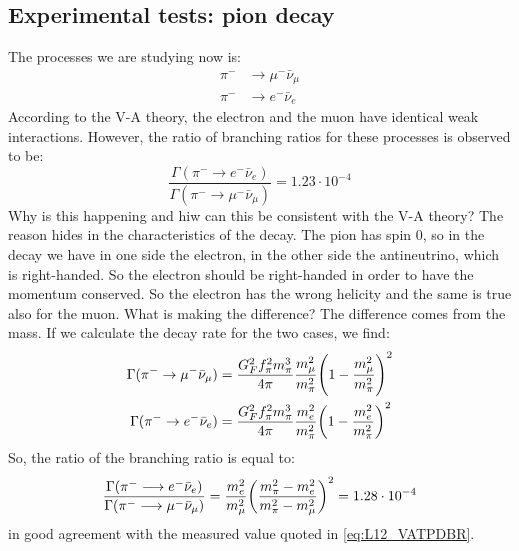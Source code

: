 \documentclass[../../main/main.tex]{subfiles}
\begin{document}
\subsection{Experimental tests: pion decay}
The processes we are studying now is:
\begin{align}
	\pi^- &\longrightarrow \mu^-\bar{\nu}_{\mu}	\\
	\pi^- &\longrightarrow e^-\bar{\nu}_{e}
\end{align}
According to the V-A theory, the electron and the muon have identical weak interactions. However, the ratio of branching ratios for these processes is observed to be:
\begin{equation}
	\frac{\Gamma(\pi^- \longrightarrow e^-\bar{\nu}_{e})}{\Gamma(\pi^- \longrightarrow \mu^-\bar{\nu}_{\mu})}
	=
	1.23 \cdot 10^{-4}
	\label{eq:L12_VATPDBR}
\end{equation}
Why is this happening and hiw can this be consistent with the V-A theory? The reason hides in the characteristics of the decay. The pion has spin 0, so in the decay we have in one side the electron, in the other side the antineutrino, which is right-handed. So the electron should be right-handed in order to have the momentum conserved. So the electron has the wrong helicity and the same is true also for the muon. What is making the difference? The difference comes from the mass. If we calculate the decay rate for the two cases, we find:
\begin{align}
	\Gamma(\pi^- \rightarrow \mu^-\bar{\nu}_{\mu})
	&=
	\frac{G^2_F f^2_{\pi} m^3_{\pi}}{4\pi} \frac{m^2_{\mu}}{m^2_{\pi}} \qty(1 - \frac{m^2_{\mu}}{m^2_{\pi}})^2
	\\
	\Gamma(\pi^- \rightarrow e^-\bar{\nu}_{e})
	&=
	\frac{G^2_F f^2_{\pi} m^3_{\pi}}{4\pi} \frac{m^2_{e}}{m^2_{\pi}} \qty(1 - \frac{m^2_{e}}{m^2_{\pi}})^2
\end{align}
So, the ratio of the branching ratio is equal to:
\begin{equation}
	\frac{\Gamma(\pi^- \longrightarrow e^-\bar{\nu}_{e})}{\Gamma(\pi^- \longrightarrow \mu^-\bar{\nu}_{\mu})}
	=
	\frac{m^2_e}{m^2_{\mu}} \qty(\frac{m^2_{\pi} - m^2_{e}}{m^2_{\pi} - m^2_{\mu}})^2
	=
	1.28 \cdot 10^{-4}
	\label{eq:L12_VATPDBR_2}
\end{equation}
in good agreement with the measured value quoted in \ref{eq:L12_VATPDBR}.
\end{document}
